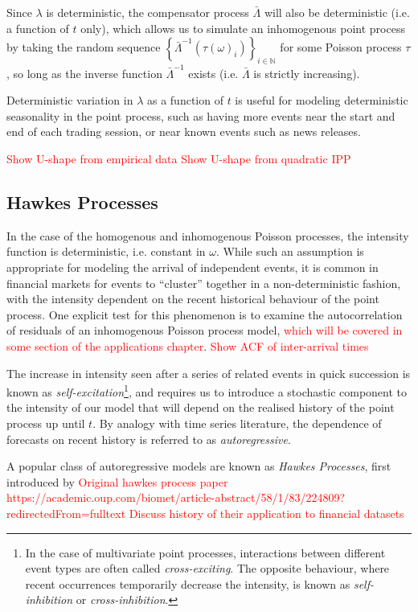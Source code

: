 \documentclass[honours,12pt]{unswthesis}
\numberwithin{equation}{section}
\begin{document}
Since $\lambda$ is deterministic, the compensator process $\bar\Lambda$ will also be deterministic (i.e. a function of $t$ only), which allows us to simulate an inhomogenous point process by taking the random sequence $\left\{{\bar\Lambda}^{-1}(\tau(\omega)_i)\right\}_{i\in\mathbb{N}}$ for some Poisson process $\tau$, so long as the inverse function ${\bar\Lambda}^{-1}$ exists (i.e. $\bar\Lambda$ is strictly increasing).

Deterministic variation in $\lambda$ as a function of $t$ is useful for modeling deterministic seasonality in the point process, such as having more events near the start and end of each trading session, or near known events such as news releases.

\textcolor{red}{Show U-shape from empirical data}
\textcolor{red}{Show U-shape from quadratic IPP}

\subsection{Hawkes Processes}
In the case of the homogenous and inhomogenous Poisson processes, the intensity function is deterministic, i.e. constant in $\omega$. While such an assumption is appropriate for modeling the arrival of independent events, it is common in financial markets for events to ``cluster'' together in a non-deterministic fashion, with the intensity dependent on the recent historical behaviour of the point process. One explicit test for this phenomenon is to examine the autocorrelation of residuals of an inhomogenous Poisson process model, \textcolor{red}{which will be covered in some section of the applications chapter}.
\textcolor{red}{Show ACF of inter-arrival times}

The increase in intensity seen after a series of related events in quick succession is known as \textit{self-excitation}\footnote{In the case of multivariate point processes, interactions between different event types are often called \textit{cross-exciting}. The opposite behaviour, where recent occurrences temporarily decrease the intensity, is known as \textit{self-inhibition} or \textit{cross-inhibition}.}, and requires us to introduce a stochastic component to the intensity of our model that will depend on the realised history of the point process up until $t$. By analogy with time series literature, the dependence of forecasts on recent history is referred to as \textit{autoregressive}.

A popular class of autoregressive models are known as \textit{Hawkes Processes}, first introduced by 
\textcolor{red}{Original hawkes process paper https://academic.oup.com/biomet/article-abstract/58/1/83/224809?redirectedFrom=fulltext}
\textcolor{red}{Discuss history of their application to financial datasets}
\end{document}
